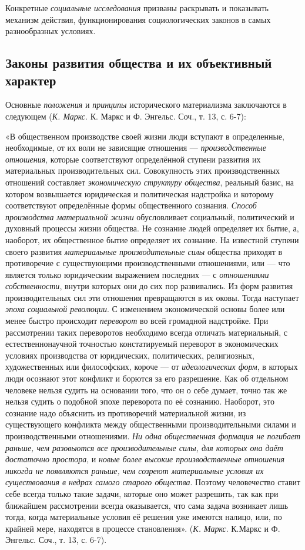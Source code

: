 \documentclass[a4paper,14pt,russian]{extreport}
\begin{document}
Конкретные \emph{социальные исследования} призваны раскрывать и показывать механизм действия, функционирования социологических законов в самых разнообразных условиях.

\subsection{Законы развития общества и их объективный характер}

Основные \emph{положения} и \emph{принципы} исторического материализма заключаются в следующем (\emph{К. Маркс}. К. Маркс и Ф. Энгельс\emph{.} Соч., т. 13, с. 6-7):

«В общественном производстве своей жизни люди вступают в определенные, необходимые, от их воли не зависящие отношения --- \emph{производственные отношения}, которые соответствуют определённой ступени развития их материальных производительных сил. Совокупность этих производственных отношений составляет \emph{экономическую структуру общества}, реальный базис, на котором возвышается юридическая и политическая надстройка и которому соответствуют определённые формы общественного сознания. \emph{Способ производства материальной жизни} обусловливает социальный, политический и духовный процессы жизни общества. Не сознание людей определяет их бытие, а, наоборот, их общественное бытие определяет их сознание. На известной ступени своего развития \emph{материальные производительные силы} общества приходят в противоречие с существующими производственными отношениями, или --- что является только юридическим выражением последних --- с \emph{отношениями собственности}, внутри которых они до сих пор развивались. Из форм развития производительных сил эти отношения превращаются в их оковы. Тогда наступает \emph{эпоха социальной революции}. С изменением экономической основы более или менее быстро происходит \emph{переворот} во всей громадной надстройке. При рассмотрении таких переворотов необходимо всегда отличать материальный, с естественнонаучной точностью констатируемый переворот в экономических условиях производства от юридических, политических, религиозных, художественных или философских, короче --- от \emph{идеологических форм}, в которых люди осознают этот конфликт и борются за его разрешение. Как об отдельном человеке нельзя судить на основании того, что он о себе думает, точно так же нельзя судить о подобной эпохе переворота по её сознанию. Наоборот, это сознание надо объяснить из противоречий материальной жизни, из существующего конфликта между общественными производительными силами и производственными отношениями. \emph{Ни одна общественная формация не погибает раньше, чем разовьются все производительные силы, для которых она даёт достаточно простора}, и \emph{новые более высокие производственные отношения никогда не появляются раньше, чем созреют материальные условия их существования в недрах самого старого общества}. Поэтому человечество ставит себе всегда только такие задачи, которые оно может разрешить, так как при ближайшем рассмотрении всегда оказывается, что сама задача возникает лишь тогда, когда материальные условия её решения уже имеются налицо, или, по крайней мере, находятся в процессе становления». (\emph{К. Маркс}. К.Маркс и Ф. Энгельс. Соч., т. 13, с. 6-7).
\end{document}
